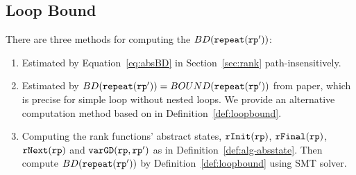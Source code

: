 
\subsection{Loop Bound}
There are three methods for computing the $BD(\mathtt{repeat}(\mathtt{rp}'))$:
\begin{enumerate}
  \item Estimated by Equation~\ref{eq:absBD} in Section~\ref{sec:rank} path-insensitively.
  \item Estimated by $BD(\mathtt{repeat}(\mathtt{rp}')) = BOUND(\mathtt{repeat}(\mathtt{rp}'))$ from paper\cite{GulwaniJK09}, which is precise for simple loop without nested loops. 
  We provide an alternative computation method based on \cite{sinn2017complexity} in Definition~\ref{def:loopbound}.
  \item Computing the rank functions' abstract states, $\mathtt{rInit}(\mathtt{rp})$, $\mathtt{rFinal}(\mathtt{rp})$, $\mathtt{rNext}(\mathtt{rp})$ and $\mathtt{varGD}(\mathtt{rp}, \mathtt{rp}')$ as in Definition~\ref{def:alg-absstate}.
  Then compute $BD(\mathtt{repeat}(\mathtt{rp}'))$ by Definition~\ref{def:loopbound} using SMT solver.
\end{enumerate}
%
